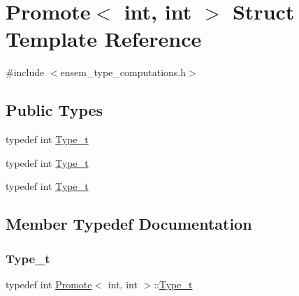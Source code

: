 \hypertarget{structPromote_3_01int_00_01int_01_4}{}\section{Promote$<$ int, int $>$ Struct Template Reference}
\label{structPromote_3_01int_00_01int_01_4}


{\ttfamily \#include $<$ensem\+\_\+type\+\_\+computations.\+h$>$}

\subsection*{Public Types}
\begin{DoxyCompactItemize}
\item 
typedef int \mbox{\hyperlink{structPromote_3_01int_00_01int_01_4_ad4def87f556a8315eb477252cb57c27b}{Type\+\_\+t}}
\item 
typedef int \mbox{\hyperlink{structPromote_3_01int_00_01int_01_4_ad4def87f556a8315eb477252cb57c27b}{Type\+\_\+t}}
\item 
typedef int \mbox{\hyperlink{structPromote_3_01int_00_01int_01_4_ad4def87f556a8315eb477252cb57c27b}{Type\+\_\+t}}
\end{DoxyCompactItemize}


\subsection{Member Typedef Documentation}
\mbox{\label{structPromote_3_01int_00_01int_01_4_ad4def87f556a8315eb477252cb57c27b}} 
\subsubsection{\texorpdfstring{Type\_t}{Type\_t}\hspace{0.1cm}{\footnotesize\ttfamily [1/3]}}
{\footnotesize\ttfamily typedef int \mbox{\hyperlink{structPromote}{Promote}}$<$ int, int $>$\+::\mbox{\hyperlink{structPromote_3_01int_00_01int_01_4_ad4def87f556a8315eb477252cb57c27b}{Type\+\_\+t}}}

\mbox{\label{structPromote_3_01int_00_01int_01_4_ad4def87f556a8315eb477252cb57c27b}} 
